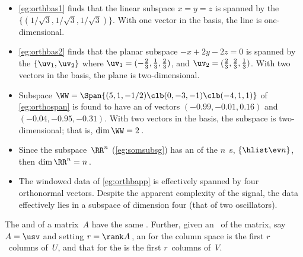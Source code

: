 \begin{example} 
\begin{itemize}
\item \cref{eg:orthbas1} finds that the linear subspace \(x=y=z\) is spanned by the  \(\{(1/{\sqrt3},1/{\sqrt3},1/{\sqrt3})\}\).  
With one vector in the basis, the line is one-dimensional.

\item \cref{eg:orthbas2} finds that the planar subspace \(-x+2y-2z=0\) is spanned by the  \(\{\uv_1,\uv_2\}\) where \(\uv_1=(-\frac23,\frac13,\frac23)\), and \(\uv_2=(\frac23,\frac23,\frac13)\).  
With two vectors in the basis, the plane is two-dimensional.

\item  Subspace \(\WW=\Span\{(5,1,-1/2)\clb (0,-3,-1)\clb (-4,1,1)\}\) of \cref{eg:orthospan} is found to have an  of  vectors  \((-0.99,-0.01,0.16)\) and \((-0.04,-0.95,-0.31)\).
With two vectors in the basis, the subspace is two-dimensional; that is, \(\dim\WW=2\)\,.

\item Since the subspace~\(\RR^n\) (\cref{eg:somsubsg}) has an  of the \(n\)~s, \(\{\hlist\ev n\}\), then  \(\dim\RR^n=n\)\,.

\item The  windowed data of \cref{eg:orthbapp} is effectively spanned by four orthonormal vectors.  Despite the apparent complexity of the signal, the data effectively lies in a subspace of dimension four (that of two oscillators).
\end{itemize}
\end{example}


\begin{theorem} \label{thm:rowcolD} 
The  and  of a matrix~\(A\) have the same .
Further, given an \svd\ of the matrix, say \(A=\usv\) and setting \(r=\rank A\)\,, an  for the column space is the first \(r\)~columns of~\(U\), and that for the  is the first \(r\)~columns of~\(V\).
\end{theorem}

